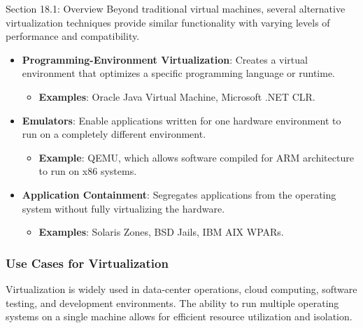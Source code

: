 \begin{notes}{Section 18.1: Overview}
    Beyond traditional virtual machines, several alternative virtualization techniques provide similar functionality with varying levels of performance and compatibility.
    
    \begin{highlight}
    
        \begin{itemize}
            \item \textbf{Programming-Environment Virtualization}: Creates a virtual environment that optimizes a specific programming language or runtime.
                \begin{itemize}
                    \item \textbf{Examples}: Oracle Java Virtual Machine, Microsoft .NET CLR.
                \end{itemize}
            \item \textbf{Emulators}: Enable applications written for one hardware environment to run on a completely different environment.
                \begin{itemize}
                    \item \textbf{Example}: QEMU, which allows software compiled for ARM architecture to run on x86 systems.
                \end{itemize}
            \item \textbf{Application Containment}: Segregates applications from the operating system without fully virtualizing the hardware.
                \begin{itemize}
                    \item \textbf{Examples}: Solaris Zones, BSD Jails, IBM AIX WPARs.
                \end{itemize}
        \end{itemize}
    
    \end{highlight}
    
    \subsubsection*{Use Cases for Virtualization}
    
    Virtualization is widely used in data-center operations, cloud computing, software testing, and development environments. The ability to run multiple operating systems on a single machine allows 
    for efficient resource utilization and isolation.
    

\end{notes}
